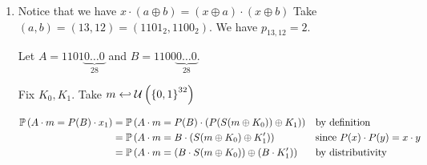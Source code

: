 \begin{enumerate}[label=\textbf{\arabic*})]
    \item
    Notice that we have $x \cdot (a \oplus b) = (x \oplus a)\cdot(x \oplus b)$
    Take $(a, b) = (13, 12) = (1101_2, 1100_2)$. We have $p_{13, 12} = 2$.

    Let $A = 1101\underbrace{0\dots0}_{28}$ and $B = 1100\underbrace{0\dots0}_{28}$.

    Fix $K_0, K_1$. Take $m \hookleftarrow \mathcal{U}\left(\left\{ 0,1 \right\}^{32}\right)$

    \begin{align*}
        \mathbb{P}\left( A\cdot m = P(B)\cdot x_1 \right) &= \mathbb{P}\left( A\cdot m = P(B) \cdot (P(S(m \oplus K_0))\oplus K_1) \right) && \text{by definition}\\
            &= \mathbb{P}\left( A\cdot m = B \cdot (S(m \oplus K_0)\oplus K'_1) \right) && \text{since }P(x) \cdot P(y) = x \cdot y\\
            &= \mathbb{P}\left( A\cdot m = (B \cdot S(m \oplus K_0))\oplus (B \cdot K'_1) \right) && \text{by distributivity}\\
    \end{align*}
\end{enumerate}


